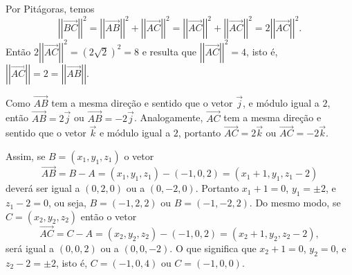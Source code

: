 \documentclass[12pt,a4paper]{article}
\newcommand{\vect}[1]{\overrightarrow{#1}}
\newcommand{\norm}[1]{\left|\left|{#1}\right|\right|}
\begin{document}
\begin{enumerate}
Por Pitágoras, temos
\[
\norm{\vect{BC}}^2
= \norm{\vect{AB}}^2 + \norm{\vect{AC}}^2
= \norm{\vect{AC}}^2 + \norm{\vect{AC}}^2
= 2 \norm{\vect{AC}}^2.
\]
Então $2 \norm{\vect{AC}}^2 = (2\sqrt{2})^2 = 8$ e resulta que $\norm{\vect{AC}}^2 = 4$, isto é, $\norm{\vect{AC}} = 2 = \norm{\vect{AB}}$.


Como $\vect{AB}$ tem a mesma direção e sentido que o vetor $\vec{j}$, e módulo igual a $2$, então $\vect{AB} = 2\vec{j}$ ou $\vect{AB} = -2\vec{j}$. Analogamente, $\vect{AC}$ tem a mesma direção e sentido que o vetor $\vec{k}$ e módulo igual a $2$, portanto $\vect{AC} = 2\vec{k}$ ou $\vect{AC} = -2\vec{k}$.

Assim, se $B=(x_1,y_1,z_1)$ o vetor
\[
\vect{AB}
= B-A
= (x_1, y_1, z_1) - (-1,0,2)
= (x_1 + 1,y_1,z_1 - 2)
\]
deverá ser igual a $(0,2,0)$ ou a $(0,-2,0)$. Portanto $x_1 + 1 = 0$, $y_1 = \pm2$, e $z_1 - 2 = 0$, ou seja, $B = (-1,2,2)$ ou $B = (-1,-2,2)$. Do mesmo modo, se $C=(x_2,y_2,z_2)$ então o vetor
\[
\vect{AC}
        = C-A
        = (x_2, y_2, z_2) - (-1,0,2)
        = (x_2 + 1, y_2, z_2 - 2),
\]
será igual a $(0,0,2)$ ou a $(0,0,-2)$. O que significa que $x_2 + 1 = 0$, $y_2 = 0$, e $z_2 - 2 = \pm2$, isto é, $C = (-1, 0, 4)$ ou $C = (-1, 0, 0)$.
\end{enumerate}
\end{document}

